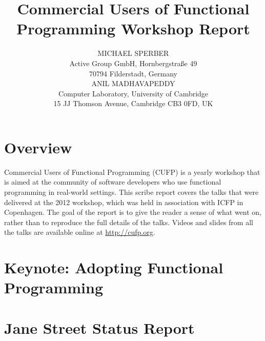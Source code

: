 \documentclass{jfp1}
\title[Commercial Users of Functional Programming 2012]
      {Commercial Users of Functional Programming Workshop Report}
\author[Michael Sperber and Anil Madhavapeddy]
       {MICHAEL SPERBER\\
         Active Group GmbH, Hornbergstra\ss{}e 49\\
         70794 Filderstadt, Germany\\
         ANIL MADHAVAPEDDY\\
        Computer Laboratory, University of Cambridge\\ 
        15 JJ Thomson Avenue, Cambridge CB3 0FD, UK}
\begin{document}
\label{firstpage}
\maketitle

\section{Overview}

Commercial Users of Functional Programming (CUFP) is a yearly workshop
that is aimed at the community of software developers who use functional
programming in real-world settings.  This scribe report covers the talks
that were delivered at the 2012 workshop, which was held in association
with ICFP in Copenhagen.  The goal of the report is to give the reader
a sense of what went on, rather than to reproduce the full details
of the talks.  Videos and slides from all the talks are available online at \url{http://cufp.org}.

\section{Keynote: Adopting Functional Programming}

\section{Jane Street Status Report}
\end{document}
